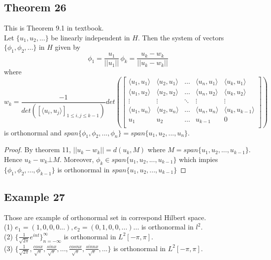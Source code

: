 \documentclass{article}
\begin{document}
\subsection*{Theorem 26}
This is Theorem 9.1 in textbook.\\
Let $\{u_1,u_2,...\}$ be linearly independent in $H$. Then the system of vectors $\{ \phi_1, \phi_2,...\}$ in $H$ given by 
\[
\phi_1=\frac{u_1}{||u_1||}\, \phi_k=\frac{u_k-w_k}{||u_k-w_k||}
\]
where
\[ 
w_k=\frac{-1}{det([\langle u_i, u_j \rangle]_{1\leq i,j\leq k-1})}det(
\begin{bmatrix}
\langle u_1, u_1 \rangle & \langle u_2, u_1 \rangle & \dots & \langle u_n, u_1 \rangle & \langle u_k, u_1 \rangle \\
\langle u_1, u_2 \rangle & \langle u_2, u_2 \rangle & \dots & \langle u_n, u_2 \rangle & \langle u_k, u_2 \rangle \\
\vdots & \vdots & \ddots & \vdots & \vdots \\
\langle u_1, u_n \rangle &\langle u_2, u_n \rangle & \dots & \langle u_n, u_n \rangle & \langle u_k, u_{k-1} \rangle \\
u_1 & u_2 & \dots & u_{k-1} & 0 \\
\end{bmatrix}
)
\]
is orthonormal and $span\{\phi_1, \phi_2, ...,\phi_n\}=span\{u_1, u_2, ...,u_n\}$.
\begin{proof}
By theorem 11, $||u_k-w_k||=d(u_k,M)$ where $M=span\{u_1, u_2, ...,u_{k-1}\}$. Hence $u_k-w_k\bot M$. Moreover, $\phi_k\in span\{u_1, u_2, ...,u_{k-1}\}$ which impies $\{\phi_1, \phi_2, ...,\phi_{k-1}\}$ is orthonormal in $span\{u_1, u_2, ...,u_{k-1}\}$
\end{proof}

\subsection*{Example 27}
Those are example of orthonormal set in correspond Hilbert space.\\
(1) $e_1=(1,0,0,0...), e_2=(0,1,0,0,...)... $ is orthonormal in $l^2$.\\
(2) $\{\frac{1}{\sqrt{2\pi}}e^{int}\}_{n=-\infty}^{\infty}$ is orthonormal in $L^2[-\pi, \pi]$.\\
(3) $\{\frac{1}{\sqrt{2\pi}},\frac{cos x}{\sqrt{\pi}},\frac{sin x}{\sqrt{\pi}},...,\frac{cos nx}{\sqrt{\pi}},\frac{sin nx}{\sqrt{\pi}},...\}$ is orthonormal in $L^2[-\pi, \pi]$.\\
\end{document}
